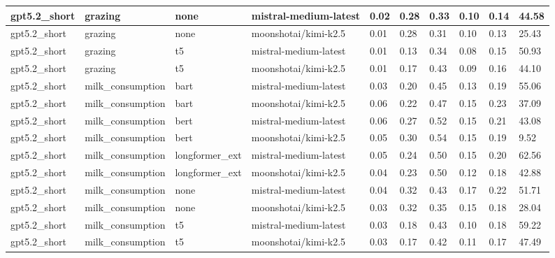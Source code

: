 \begin{tabular}{|l|l|l|l|l|l|l|l|l|l|}
 \hline
 gpt5.2\_short & grazing & none & mistral-medium-latest & 0.02 & 0.28 & 0.33 & 0.10 & 0.14 & 44.58 \\
 \hline
 gpt5.2\_short & grazing & none & moonshotai/kimi-k2.5 & 0.01 & 0.28 & 0.31 & 0.10 & 0.13 & 25.43 \\
 \hline
 gpt5.2\_short & grazing & t5 & mistral-medium-latest & 0.01 & 0.13 & 0.34 & 0.08 & 0.15 & 50.93 \\
 \hline
 gpt5.2\_short & grazing & t5 & moonshotai/kimi-k2.5 & 0.01 & 0.17 & 0.43 & 0.09 & 0.16 & 44.10 \\
 \hline
 gpt5.2\_short & milk\_consumption & bart & mistral-medium-latest & 0.03 & 0.20 & 0.45 & 0.13 & 0.19 & 55.06 \\
 \hline
 gpt5.2\_short & milk\_consumption & bart & moonshotai/kimi-k2.5 & 0.06 & 0.22 & 0.47 & 0.15 & 0.23 & 37.09 \\
 \hline
 gpt5.2\_short & milk\_consumption & bert & mistral-medium-latest & 0.06 & 0.27 & 0.52 & 0.15 & 0.21 & 43.08 \\
 \hline
 gpt5.2\_short & milk\_consumption & bert & moonshotai/kimi-k2.5 & 0.05 & 0.30 & 0.54 & 0.15 & 0.19 & 9.52 \\
 \hline
 gpt5.2\_short & milk\_consumption & longformer\_ext & mistral-medium-latest & 0.05 & 0.24 & 0.50 & 0.15 & 0.20 & 62.56 \\
 \hline
 gpt5.2\_short & milk\_consumption & longformer\_ext & moonshotai/kimi-k2.5 & 0.04 & 0.23 & 0.50 & 0.12 & 0.18 & 42.88 \\
 \hline
 gpt5.2\_short & milk\_consumption & none & mistral-medium-latest & 0.04 & 0.32 & 0.43 & 0.17 & 0.22 & 51.71 \\
 \hline
 gpt5.2\_short & milk\_consumption & none & moonshotai/kimi-k2.5 & 0.03 & 0.32 & 0.35 & 0.15 & 0.18 & 28.04 \\
 \hline
 gpt5.2\_short & milk\_consumption & t5 & mistral-medium-latest & 0.03 & 0.18 & 0.43 & 0.10 & 0.18 & 59.22 \\
 \hline
 gpt5.2\_short & milk\_consumption & t5 & moonshotai/kimi-k2.5 & 0.03 & 0.17 & 0.42 & 0.11 & 0.17 & 47.49 \\
\hline
\end{tabular}
